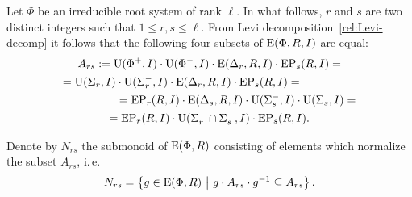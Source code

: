 Let $\Phi$ be an irreducible root system of rank $\ell$.
In what follows, $r$ and $s$ are two distinct integers such that $1 \leq r, s \leq \ell$.
From Levi decomposition~\eqref{rel:Levi-decomp} it follows that the following four subsets of $\operatorname{E}(\Phi, R, I)$ are equal:
\begin{multline*}
A_{rs} := \operatorname{U}(\Phi^+, I)\cdot \operatorname{U}(\Phi^-, I) \cdot \operatorname{E}(\Delta_r, R, I) \cdot \operatorname{EP}_s(R, I) = \\
= \operatorname{U}(\Sigma_r, I)\cdot \operatorname{U}(\Sigma^-_r, I) \cdot \operatorname{E}(\Delta_r, R, I) \cdot \operatorname{EP}_s(R, I) = \hspace{5em} \\
\hspace{5em} = \operatorname{EP}_r(R, I) \cdot \operatorname{E}(\Delta_s, R, I) \cdot \operatorname{U}(\Sigma_s^-, I)\cdot \operatorname{U}(\Sigma_s, I) = \\
= \operatorname{EP}_r(R, I) \cdot \operatorname{U}(\Sigma^-_r \cap \Sigma^-_s, I) \cdot \operatorname{EP}_s(R, I).
\end{multline*}

Denote by $N_{rs}$ the submonoid of $\operatorname{E}(\Phi, R)$ consisting of elements which normalize the subset $A_{rs}$, i.\,e.
\[ N_{rs} = \left\{ g\in \E(\Phi, R)\ \middle|\ g \cdot A_{rs} \cdot g^{-1} \subseteq A_{rs} \right\}. \]

